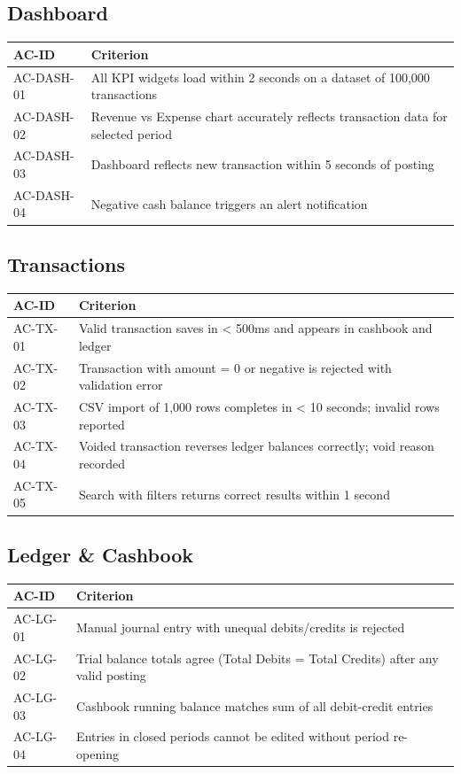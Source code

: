 \documentclass[journal, a4paper, onecolumn, 12pt]{IEEEtran}
\begin{document}
\subsection{Dashboard}
\begin{longtable}{|p{}|p{}|}
\hline
AC-ID & Criterion \\ \hline
\hline
AC-DASH-01 & All KPI widgets load within 2 seconds on a dataset of 100,000 transactions \\ \hline
AC-DASH-02 & Revenue vs Expense chart accurately reflects transaction data for selected period \\ \hline
AC-DASH-03 & Dashboard reflects new transaction within 5 seconds of posting \\ \hline
AC-DASH-04 & Negative cash balance triggers an alert notification \\ \hline
\end{longtable}
\subsection{Transactions}
\begin{longtable}{|p{}|p{}|}
\hline
AC-ID & Criterion \\ \hline
\hline
AC-TX-01 & Valid transaction saves in < 500ms and appears in cashbook and ledger \\ \hline
AC-TX-02 & Transaction with amount = 0 or negative is rejected with validation error \\ \hline
AC-TX-03 & CSV import of 1,000 rows completes in < 10 seconds; invalid rows reported \\ \hline
AC-TX-04 & Voided transaction reverses ledger balances correctly; void reason recorded \\ \hline
AC-TX-05 & Search with filters returns correct results within 1 second \\ \hline
\end{longtable}
\subsection{Ledger \& Cashbook}
\begin{longtable}{|p{}|p{}|}
\hline
AC-ID & Criterion \\ \hline
\hline
AC-LG-01 & Manual journal entry with unequal debits/credits is rejected \\ \hline
AC-LG-02 & Trial balance totals agree (Total Debits = Total Credits) after any valid posting \\ \hline
AC-LG-03 & Cashbook running balance matches sum of all debit-credit entries \\ \hline
AC-LG-04 & Entries in closed periods cannot be edited without period re-opening \\ \hline
\end{longtable}
\end{document}
